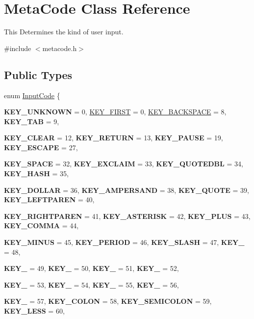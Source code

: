 \hypertarget{classMetaCode}{
\section{MetaCode Class Reference}
\label{d7/d72/classMetaCode}
}


This Determines the kind of user input.  


{\ttfamily \#include $<$metacode.h$>$}\subsection*{Public Types}
\begin{DoxyCompactItemize}
\item 
enum \hyperlink{classMetaCode_a7390e6f58e25c0ce377bba4e63081b24}{InputCode} \{ \par
{\bfseries KEY\_\-UNKNOWN} =  0, 
\hyperlink{classMetaCode_a7390e6f58e25c0ce377bba4e63081b24af7c19e29f8e1299858f9a9a0e2e0df32}{KEY\_\-FIRST} =  0, 
\hyperlink{classMetaCode_a7390e6f58e25c0ce377bba4e63081b24a11be427f22c538fc5682e0b7fa3e1e6d}{KEY\_\-BACKSPACE} =  8, 
{\bfseries KEY\_\-TAB} =  9, 
\par
{\bfseries KEY\_\-CLEAR} =  12, 
{\bfseries KEY\_\-RETURN} =  13, 
{\bfseries KEY\_\-PAUSE} =  19, 
{\bfseries KEY\_\-ESCAPE} =  27, 
\par
{\bfseries KEY\_\-SPACE} =  32, 
{\bfseries KEY\_\-EXCLAIM} =  33, 
{\bfseries KEY\_\-QUOTEDBL} =  34, 
{\bfseries KEY\_\-HASH} =  35, 
\par
{\bfseries KEY\_\-DOLLAR} =  36, 
{\bfseries KEY\_\-AMPERSAND} =  38, 
{\bfseries KEY\_\-QUOTE} =  39, 
{\bfseries KEY\_\-LEFTPAREN} =  40, 
\par
{\bfseries KEY\_\-RIGHTPAREN} =  41, 
{\bfseries KEY\_\-ASTERISK} =  42, 
{\bfseries KEY\_\-PLUS} =  43, 
{\bfseries KEY\_\-COMMA} =  44, 
\par
{\bfseries KEY\_\-MINUS} =  45, 
{\bfseries KEY\_\-PERIOD} =  46, 
{\bfseries KEY\_\-SLASH} =  47, 
{\bfseries KEY\_} =  48, 
\par
{\bfseries KEY\_} =  49, 
{\bfseries KEY\_} =  50, 
{\bfseries KEY\_} =  51, 
{\bfseries KEY\_} =  52, 
\par
{\bfseries KEY\_} =  53, 
{\bfseries KEY\_} =  54, 
{\bfseries KEY\_} =  55, 
{\bfseries KEY\_} =  56, 
\par
{\bfseries KEY\_} =  57, 
{\bfseries KEY\_\-COLON} =  58, 
{\bfseries KEY\_\-SEMICOLON} =  59, 
{\bfseries KEY\_\-LESS} =  60, 
\par

\end{DoxyCompactItemize}
